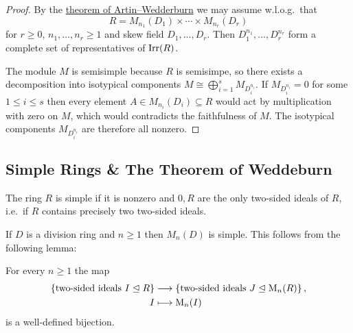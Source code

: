 \begin{proof}
  By the \hyperref[theorem: artin wedderburn theorem]{theorem of Artin--Wedderburn} we may assume w.l.o.g.\ that
  \[
    R = M_{n_1}(D_1) \times \dotsb \times M_{n_r}(D_r)
  \]
  for $r \geq 0$, $n_1, \dotsc, n_r \geq 1$ and skew field $D_1, \dotsc, D_r$.
  Then $D_1^{n_1}, \dotsc, D_r^{n_r}$ form a complete set of representatives of $\operatorname{Irr}(R)$.
  
  The module $M$ is semisimple because $R$ is semisimpe, so there exists a decomposition into isotypical components $M \cong \bigoplus_{i=1}^s M_{D_i^{n_i}}$.
  If $M_{D_i^{n_i}} = 0$ for some $1 \leq i \leq s$ then every element $A \in M_{n_i}(D_i) \subseteq R$ would act by multiplication with zero on $M$, which would contradicts the faithfulness of $M$.
  The isotypical components $M_{D_i^{n_i}}$ are therefore all nonzero.
\end{proof}





\subsection{Simple Rings \& The Theorem of Weddeburn}


\begin{definition}
  The ring $R$ is simple if it is nonzero and $0, R$ are the only two-sided ideals of $R$, i.e.\ if $R$ contains precisely two two-sided ideals.
\end{definition}


\begin{example}
  \label{example: simple ring}
  If $D$ is a division ring and $n \geq 1$ then $M_n(D)$ is simple.
  This follows from the following lemma:
\end{example}


\begin{lemma}
  For every $n \geq 1$ the map
  \begin{align*}
              \{ \text{two-sided ideals $I \trianglelefteq R$} \}
    &\longrightarrow  \{ \text{two-sided ideals $J \trianglelefteq \operatorname{M}_n(R)$} \} \,,
    \\
                  I
    &\longmapsto  \operatorname{M}_n(I)
  \end{align*}
  is a well-defined bijection.
\end{lemma}


